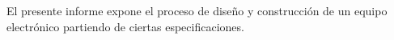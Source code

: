 El presente informe expone el proceso de diseño y construcción de un equipo electrónico partiendo de ciertas especificaciones.
